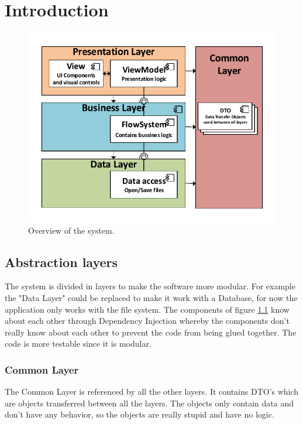 \chapter{Introduction}
\begin{figure}[h!]
  \centering
    \includegraphics{figures/SystemOverview.pdf}
  \caption{Overview of the system.}
  \label{fig:systemoverview}
\end{figure}

\section{Abstraction layers}
The system is divided in layers to make the software more modular. For example the "Data Layer" could be replaced to make it work with a Database, for now the application only works with the file system. The components of figure \ref{fig:systemoverview} know about each other through Dependency Injection whereby the components don't really know about each other to prevent the code from being glued together. The code is more testable since it is modular.

\subsection{Common Layer}
The Common Layer is referenced by all the other layers. It contains DTO's which are objects transferred between all the layers. The objects only contain data and don't have any behavior, so the objects are really stupid and have no logic.

